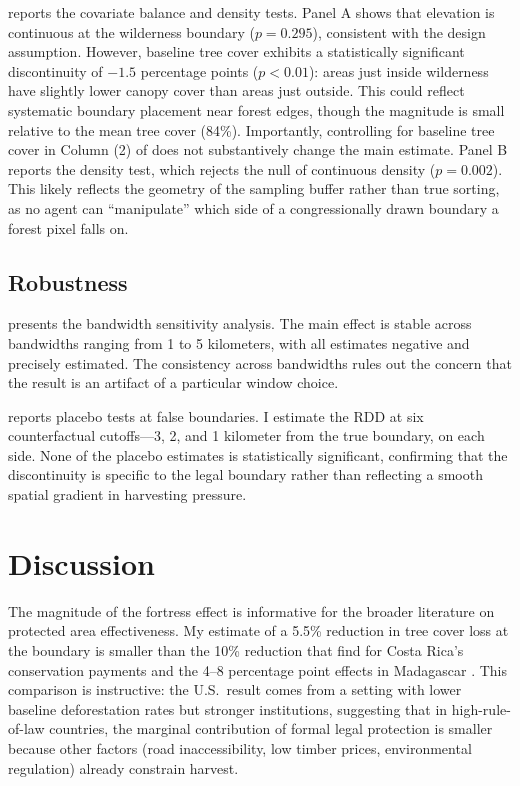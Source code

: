 \documentclass[12pt]{article}
\begin{document}
 reports the covariate balance and density tests. Panel A shows that elevation is continuous at the wilderness boundary ($p = 0.295$), consistent with the design assumption. However, baseline tree cover exhibits a statistically significant discontinuity of $-1.5$ percentage points ($p < 0.01$): areas just inside wilderness have slightly lower canopy cover than areas just outside. This could reflect systematic boundary placement near forest edges, though the magnitude is small relative to the mean tree cover (84\%). Importantly, controlling for baseline tree cover in Column (2) of  does not substantively change the main estimate. Panel B reports the \citet{CattaneoEtAl2020density} density test, which rejects the null of continuous density ($p = 0.002$). This likely reflects the geometry of the sampling buffer rather than true sorting, as no agent can ``manipulate'' which side of a congressionally drawn boundary a forest pixel falls on.



\subsection{Robustness}

 presents the bandwidth sensitivity analysis. The main effect is stable across bandwidths ranging from 1 to 5 kilometers, with all estimates negative and precisely estimated. The consistency across bandwidths rules out the concern that the result is an artifact of a particular window choice.



 reports placebo tests at false boundaries. I estimate the RDD at six counterfactual cutoffs---3, 2, and 1 kilometer from the true boundary, on each side. None of the placebo estimates is statistically significant, confirming that the discontinuity is specific to the legal boundary rather than reflecting a smooth spatial gradient in harvesting pressure.




\section{Discussion}

The magnitude of the fortress effect is informative for the broader literature on protected area effectiveness. My estimate of a 5.5\% reduction in tree cover loss at the boundary is smaller than the 10\% reduction that \citet{AnstadtAndPfaff2004} find for Costa Rica's conservation payments and the 4--8 percentage point effects in Madagascar \citep{Ferraro2011}. This comparison is instructive: the U.S.\ result comes from a setting with lower baseline deforestation rates but stronger institutions, suggesting that in high-rule-of-law countries, the marginal contribution of formal legal protection is smaller because other factors (road inaccessibility, low timber prices, environmental regulation) already constrain harvest.
\end{document}
